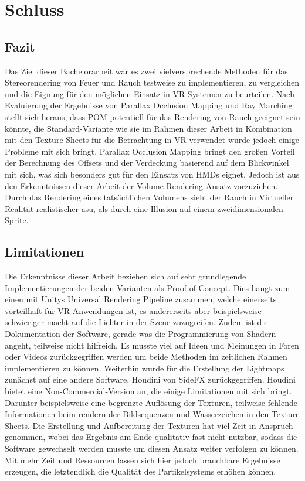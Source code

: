 \section{Schluss}
\label{sec:6}

\subsection{Fazit}
\label{sec:6.1}
Das Ziel dieser Bachelorarbeit war es zwei vielversprechende Methoden für das Stereorendering von Feuer und Rauch testweise zu implementieren, 
zu vergleichen und die Eignung für den möglichen Einsatz in VR-Systemen zu beurteilen. Nach Evaluierung der Ergebnisse von Parallax Occlusion Mapping
und Ray Marching stellt sich heraus, dass POM potentiell für das Rendering von Rauch geeignet sein könnte, die Standard-Variante wie sie im Rahmen 
dieser Arbeit in Kombination mit den Texture Sheets für die Betrachtung in VR verwendet wurde jedoch einige Probleme mit sich bringt. Parallax Occlusion 
Mapping bringt den großen Vorteil der Berechnung des Offsets und der Verdeckung basierend auf dem Blickwinkel mit sich, was sich besonders gut für den 
Einsatz von HMDs eignet. Jedoch ist aus den Erkenntnissen dieser Arbeit der Volume Rendering-Ansatz vorzuziehen. 
Durch das Rendering eines tatsächlichen Volumens sieht der Rauch in Virtueller Realität realistischer asu, als durch eine Illusion auf einem zweidimensionalen Sprite. 



\subsection{Limitationen}
\label{sec:6.2}

Die Erkenntnisse dieser Arbeit beziehen sich auf sehr grundlegende Implementierungen der beiden Varianten als Proof of Concept. Dies hängt zum einen mit 
Unitys Universal Rendering Pipeline zusammen, welche einerseits vorteilhaft für VR-Anwendungen ist, es andererseits aber beispielsweise schwieriger macht
auf die Lichter in der Szene zuzugreifen. Zudem ist die Dokumentation der Software, gerade was die Programmierung von Shadern angeht, teilweise nicht hilfreich. 
Es musste viel auf Ideen und Meinungen in Foren oder Videos zurückgegriffen werden um beide Methoden im zeitlichen Rahmen implementieren zu können. 
Weiterhin wurde für die Erstellung der Lightmaps zunächst auf eine andere Software, Houdini von SideFX zurückgegriffen.
Houdini bietet eine Non-Commercial-Version an, die einige Limitationen mit sich bringt. Darunter beispielsweise eine begrenzte Auflösung der Texturen, 
teilweise fehlende Informationen beim rendern der Bildsequenzen und Wasserzeichen in den Texture Sheets. Die Erstellung und Aufbereitung der Texturen hat viel Zeit
in Anspruch genommen, wobei das Ergebnis am Ende qualitativ fast nicht nutzbar, sodass die Software gewechselt werden musste um diesen Ansatz weiter verfolgen zu können.
Mit mehr Zeit und Ressourcen lassen sich hier jedoch brauchbare Ergebnisse erzeugen, die letztendlich die Qualität des Partikelsystems erhöhen können. 



